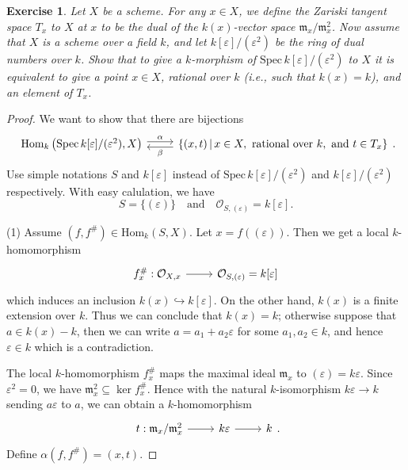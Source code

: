 \documentclass{amsart}
\newtheorem{exe}{Exercise}[subsection]
\theoremstyle{remark}\newtheorem{rmk}[theorem]{Remark}
\begin{document}
\begin{exe}
	Let $X$ be a scheme. For any $x\in X$, we define the \emph{Zariski tangent space} $T_x$ to $X$ at $x$ to be the dual of the $k(x)$-vector space $\mathfrak{m}_x/\mathfrak{m}_x^2$. Now assume that $X$ is a scheme over a field $k$, and let $k[\varepsilon]/(\varepsilon^2)$ be the ring of dual numbers over $k$. Show that to give a $k$-morphism of $\mathrm{Spec}\,k[\varepsilon]/(\varepsilon^2)$ to $X$ it is equivalent to give a point $x\in X$, \emph{rational over} $k$ (i.e., such that $k(x)=k$), and an element of $T_x$.
\end{exe}

\begin{proof}
	We want to show that there are bijections
	\begin{equation*}
		\begin{tikzcd}
			{\mathrm{Hom}_k\left(\mathrm{Spec}\,k[\varepsilon]/(\varepsilon^2),X\right)} \arrow[r, "\alpha", shift left] & {\{(x,t)\,|\,x\in X,\ \text{rational over }k ,\ \text{and }t\in T_x \}} \arrow[l, "\beta", shift left]
		\end{tikzcd}.
	\end{equation*}
	Use simple notations $S$ and $k[\varepsilon]$ instead of $\mathrm{Spec}\,k[\varepsilon]/(\varepsilon^2)$ and $k[\varepsilon]/(\varepsilon^2)$ respectively. With easy calulation, we have$$S=\{(\varepsilon)\}\quad\text{and}\quad\mathcal{O}_{S,(\varepsilon)}=k[\varepsilon].$$
	
	(1) Assume $(f,f^\#)\in\mathrm{Hom}_k(S,X)$. Let $x=f((\varepsilon))$. Then we get a local $k$-homomorphism
	\begin{equation*}
		\begin{tikzcd}
			{f^\#_x:\mathcal{O}_{X,x}} \arrow[r] & {\mathcal{O}_{S,(\varepsilon)}=k[\varepsilon]}
		\end{tikzcd}
	\end{equation*}
	which induces an inclusion $k(x)\hookrightarrow k[\varepsilon]$. On the other hand, $k(x)$ is a finite extension over $k$. Thus we can conclude that $k(x)=k$; otherwise suppose that $a\in k(x)-k$, then we can write $a=a_1+a_2\varepsilon$ for some $a_1,a_2\in k$, and hence $\varepsilon\in k$ which is a contradiction.
	
	The local $k$-homomorphism $f_x^\#$ maps the maximal ideal $\mathfrak{m}_x$ to $(\varepsilon)=k\varepsilon$. Since $\varepsilon^2=0$, we have $\mathfrak{m}_x^2\subseteq\ker f^\#_x$. Hence with the natural $k$-isomorphism $k\varepsilon\to k$ sending $a\varepsilon$ to $a$, we can obtain a $k$-homomorphism
	\begin{equation*}
		\begin{tikzcd}
			t:\mathfrak{m}_x/\mathfrak{m}_x^2 \arrow[r] & k\varepsilon \arrow[r] & k
		\end{tikzcd}.
	\end{equation*}
	Define $\alpha(f,f^\#)=(x,t)$.
	

\end{proof}
\end{document}
